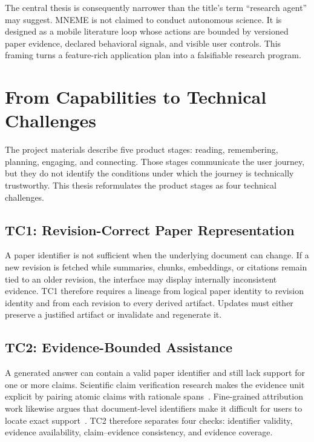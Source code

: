 The central thesis is consequently narrower than the title's term ``research agent'' may suggest.
MNEME is not claimed to conduct autonomous science.
It is designed as a mobile literature loop whose actions are bounded by versioned paper evidence, declared behavioral signals, and visible user controls.
This framing turns a feature-rich application plan into a falsifiable research program.

\section{From Capabilities to Technical Challenges}

The project materials describe five product stages: reading, remembering, planning, engaging, and connecting.
Those stages communicate the user journey, but they do not identify the conditions under which the journey is technically trustworthy.
This thesis reformulates the product stages as four technical challenges.

\subsection{TC1: Revision-Correct Paper Representation}

A paper identifier is not sufficient when the underlying document can change.
If a new revision is fetched while summaries, chunks, embeddings, or citations remain tied to an older revision, the interface may display internally inconsistent evidence.
TC1 therefore requires a lineage from logical paper identity to revision identity and from each revision to every derived artifact.
Updates must either preserve a justified artifact or invalidate and regenerate it.

\subsection{TC2: Evidence-Bounded Assistance}

A generated answer can contain a valid paper identifier and still lack support for one or more claims.
Scientific claim verification research makes the evidence unit explicit by pairing atomic claims with rationale spans~\cite{wadden2020scifact}.
Fine-grained attribution work likewise argues that document-level identifiers make it difficult for users to locate exact support~\cite{huang2024grounded}.
TC2 therefore separates four checks: identifier validity, evidence availability, claim--evidence consistency, and evidence coverage.

